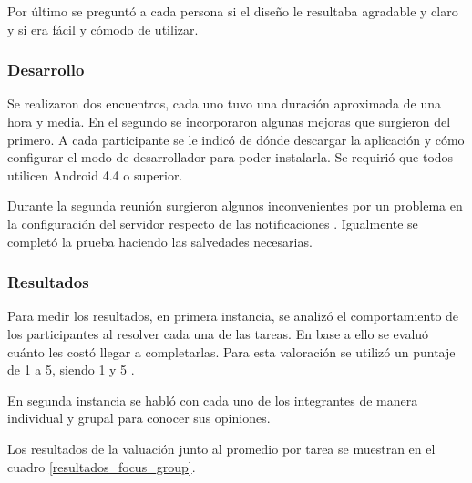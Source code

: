 Por último se preguntó a cada persona si el diseño le resultaba agradable y claro y si era fácil y cómodo de utilizar.

\subsubsection{Desarrollo}
\label{desarrollo_pruebas_usabilidad_desarrollo}

Se realizaron dos encuentros, cada uno tuvo una duración aproximada de una hora y media. En el segundo se incorporaron algunas mejoras que surgieron del primero.
A cada participante se le indicó de dónde descargar la aplicación y cómo configurar el modo de desarrollador para poder instalarla.
Se requirió que todos utilicen Android 4.4 o superior.

Durante la segunda reunión surgieron algunos inconvenientes por un problema en la configuración del servidor respecto de las notificaciones . Igualmente se completó la prueba haciendo las salvedades necesarias.


\subsubsection{Resultados}
\label{desarrollo_pruebas_usabilidad_resultados}

Para medir los resultados, en primera instancia, se analizó el comportamiento de los participantes al resolver cada una de las tareas. En base a ello se evaluó cuánto les costó llegar a completarlas. Para esta valoración se utilizó un puntaje de 1 a 5, siendo 1  y 5 .

En segunda instancia se habló con cada uno de los integrantes de manera individual y grupal para conocer sus opiniones.

Los resultados de la valuación junto al promedio por tarea se muestran en el cuadro \ref{resultados_focus_group}.


